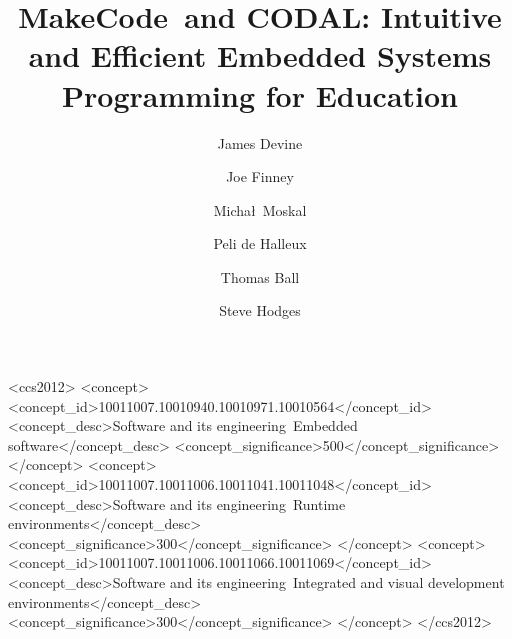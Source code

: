\documentclass[sigplan, screen]{acmart}
\newcommand{\MC}{MakeCode\ }
\newcommand{\CON}{CODAL}
\begin{document}
\title[Embedded Systems Programming for Education]{\MC and \CON: Intuitive and Efficient Embedded Systems Programming for Education}         %

\acmPrice{}


\author{James Devine}

\author{Joe Finney}

\author{Micha\l\ Moskal}

\author{Peli de Halleux}

\author{Thomas Ball}

\author{Steve Hodges}



\begin{CCSXML}
  <ccs2012>
  <concept>
  <concept_id>10011007.10010940.10010971.10010564</concept_id>
  <concept_desc>Software and its engineering~Embedded software</concept_desc>
  <concept_significance>500</concept_significance>
  </concept>
  <concept>
  <concept_id>10011007.10011006.10011041.10011048</concept_id>
  <concept_desc>Software and its engineering~Runtime environments</concept_desc>
  <concept_significance>300</concept_significance>
  </concept>
  <concept>
  <concept_id>10011007.10011006.10011066.10011069</concept_id>
  <concept_desc>Software and its engineering~Integrated and visual development environments</concept_desc>
  <concept_significance>300</concept_significance>
  </concept>
  </ccs2012>
\end{CCSXML}
\end{document}
